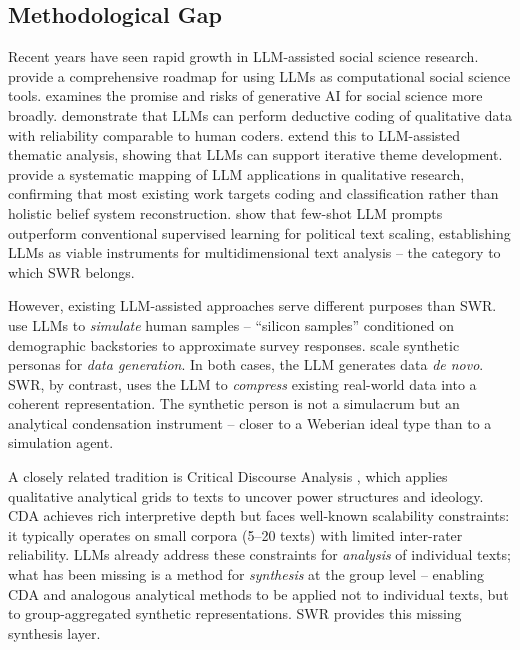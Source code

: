 \documentclass[11pt,a4paper]{article}
\begin{document}
\subsection{Methodological Gap}
\label{sec:intro:gap}

Recent years have seen rapid growth in LLM-assisted social science research. \citet{Ziems2024} provide a comprehensive roadmap for using LLMs as computational social science tools. \citet{Bail2024} examines the promise and risks of generative AI for social science more broadly. \citet{Tai2024} demonstrate that LLMs can perform deductive coding of qualitative data with reliability comparable to human coders. \citet{Wang2025} extend this to LLM-assisted thematic analysis, showing that LLMs can support iterative theme development. \citet{Barros2024} provide a systematic mapping of LLM applications in qualitative research, confirming that most existing work targets coding and classification rather than holistic belief system reconstruction. \citet{Ornstein2025} show that few-shot LLM prompts outperform conventional supervised learning for political text scaling, establishing LLMs as viable instruments for multidimensional text analysis -- the category to which SWR belongs.

However, existing LLM-assisted approaches serve different purposes than SWR. \citet{Argyle2023} use LLMs to \emph{simulate} human samples -- ``silicon samples'' conditioned on demographic backstories to approximate survey responses. \citet{Ge2024} scale synthetic personas for \emph{data generation}. In both cases, the LLM generates data \emph{de novo}. SWR, by contrast, uses the LLM to \emph{compress} existing real-world data into a coherent representation. The synthetic person is not a simulacrum but an analytical condensation instrument -- closer to a Weberian ideal type than to a simulation agent.

A closely related tradition is Critical Discourse Analysis \citep[CDA;][]{Fairclough1992, Wodak2001}, which applies qualitative analytical grids to texts to uncover power structures and ideology. CDA achieves rich interpretive depth but faces well-known scalability constraints: it typically operates on small corpora (5--20 texts) with limited inter-rater reliability. LLMs already address these constraints for \emph{analysis} of individual texts; what has been missing is a method for \emph{synthesis} at the group level -- enabling CDA and analogous analytical methods to be applied not to individual texts, but to group-aggregated synthetic representations. SWR provides this missing synthesis layer.
\end{document}
